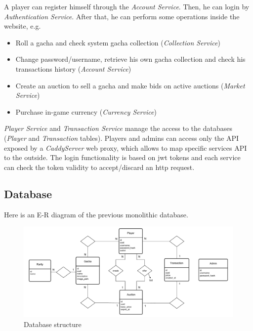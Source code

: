 \documentclass{article}
\begin{document}
A player can register himself through the \emph{Account Service}. Then, he can login by \emph{Authentication Service}. After that, he can perform some operations inside the website, e.g.
\begin{itemize}
    \item Roll a gacha and check system gacha collection (\emph{Collection Service})
    \item Change password/username, retrieve his own gacha collection and check his transactions history (\emph{Account Service})
    \item Create an auction to sell a gacha and make bids on active auctions (\emph{Market Service})
    \item Purchase in-game currency (\emph{Currency Service})
\end{itemize}
\emph{Player Service} and \emph{Transaction Service} manage the access to the databases (\emph{Player} and \emph{Transaction} tables). Players and admins can access only the API exposed by a \emph{CaddyServer} web proxy, which allows to map specific services API to the outside. The login functionality is based on jwt tokens and each service can check the token validity to accept/discard an http request.

\subsection{Database}
Here is an E-R diagram of the previous monolithic database.
\begin{figure}[ht]
    \centering
    \includegraphics[width=12cm]{ASE-er-v4.png}
    \caption{Database structure}
\end{figure}
\end{document}
